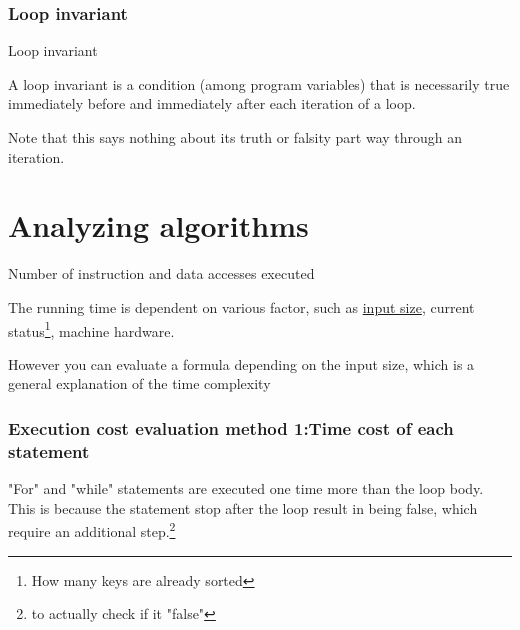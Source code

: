 \subsubsection{Loop invariant}

\begin{definition*}
Loop invariant
\begin{definition}\label{def:loop_invariants_1}
    A loop invariant is a condition (among program variables) that is necessarily true immediately before and immediately after each iteration of a loop. 
\end{definition}
\begin{note}\label{note:loop_invariant_iteration_boolean_state_1}
    Note that this says nothing about its truth or falsity part way through an iteration.
\end{note}

\end{definition*}


\section{Analyzing algorithms}

\begin{definition}\label{def:running_time_1}
    Number of instruction and data accesses executed
\end{definition}

\begin{note}\label{note:running_time_1}
The running time is dependent on various factor, such as \hyperref[def:constant_factor_2]{input size}, current status\footnote{How many keys are already sorted}, machine hardware.

However you can evaluate a formula depending on the input size, which is a general explanation of the time complexity

\end{note}


\subsubsection{Execution cost evaluation method 1:Time cost of each statement}

\begin{note}\label{note:statement_execution_number_1}
    "For" and "while" statements are executed one time more than the loop body.
    This is because the statement stop after the loop result in being false, which require an additional step.\footnote{to actually check if it "false"}
\end{note}